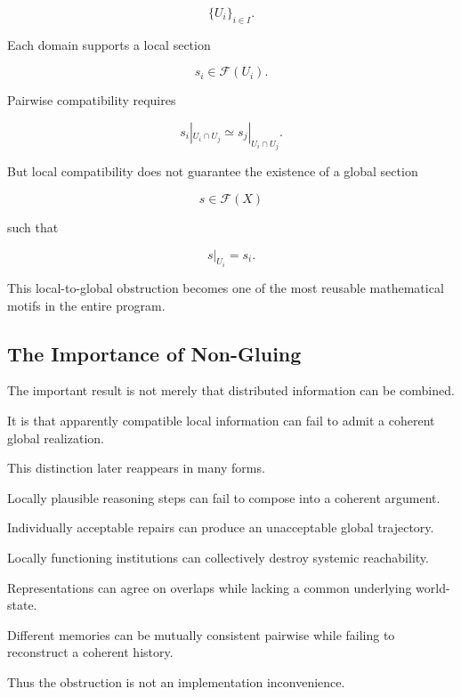 \documentclass[11pt]{article}
\theoremstyle{remark}
\begin{document}
\begin{equation}
\{U_i\}_{i\in I}.
\end{equation}

Each domain supports a local section

\begin{equation}
s_i\in\mathcal{F}(U_i).
\end{equation}

Pairwise compatibility requires

\begin{equation}
s_i|_{U_i\cap U_j}
\simeq
s_j|_{U_i\cap U_j}.
\end{equation}

But local compatibility does not guarantee the existence of a global section

\begin{equation}
s\in\mathcal{F}(X)
\end{equation}

such that

\begin{equation}
s|_{U_i}=s_i.
\end{equation}

This local-to-global obstruction becomes one of the most reusable mathematical motifs in the entire program.

\subsection{The Importance of Non-Gluing}

The important result is not merely that distributed information can be combined.

It is that apparently compatible local information can fail to admit a coherent global realization.

This distinction later reappears in many forms.

Locally plausible reasoning steps can fail to compose into a coherent argument.

Individually acceptable repairs can produce an unacceptable global trajectory.

Locally functioning institutions can collectively destroy systemic reachability.

Representations can agree on overlaps while lacking a common underlying world-state.

Different memories can be mutually consistent pairwise while failing to reconstruct a coherent history.

Thus the obstruction is not an implementation inconvenience.
\end{document}
